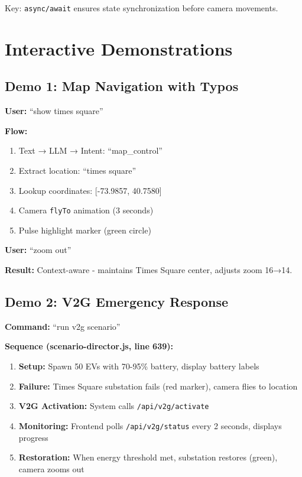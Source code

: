 \documentclass[sigconf]{acmart}
\begin{document}
Key: \texttt{async/await} ensures state synchronization before camera movements.

\section{Interactive Demonstrations}

\subsection{Demo 1: Map Navigation with Typos}

\textbf{User:} ``show times square''

\textbf{Flow:}
\begin{enumerate}
    \item Text → LLM → Intent: ``map\_control''
    \item Extract location: ``times square''
    \item Lookup coordinates: [-73.9857, 40.7580]
    \item Camera \texttt{flyTo} animation (3 seconds)
    \item Pulse highlight marker (green circle)
\end{enumerate}

\textbf{User:} ``zoom out''

\textbf{Result:} Context-aware - maintains Times Square center, adjusts zoom 16→14.

\subsection{Demo 2: V2G Emergency Response}

\textbf{Command:} ``run v2g scenario''

\textbf{Sequence (scenario-director.js, line 639):}
\begin{enumerate}
    \item \textbf{Setup:} Spawn 50 EVs with 70-95\% battery, display battery labels
    \item \textbf{Failure:} Times Square substation fails (red marker), camera flies to location
    \item \textbf{V2G Activation:} System calls \texttt{/api/v2g/activate}
    \item \textbf{Monitoring:} Frontend polls \texttt{/api/v2g/status} every 2 seconds, displays progress
    \item \textbf{Restoration:} When energy threshold met, substation restores (green), camera zooms out
\end{enumerate}
\end{document}
